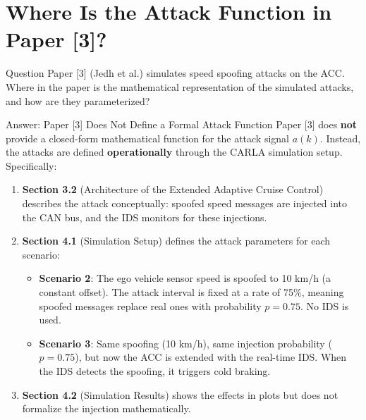 \section{Where Is the Attack Function in Paper [3]?}

\begin{questionbox}{Question}
Paper [3] (Jedh et al.) simulates speed spoofing attacks on the ACC. Where in the paper is the mathematical representation of the simulated attacks, and how are they parameterized?
\end{questionbox}

\begin{contextbox}{Answer: Paper [3] Does Not Define a Formal Attack Function}
Paper [3] does \textbf{not} provide a closed-form mathematical function for the attack signal $a(k)$. Instead, the attacks are defined \textbf{operationally} through the CARLA simulation setup. Specifically:

\begin{enumerate}[label=\textbf{\arabic*.}]
  \item \textbf{Section 3.2} (Architecture of the Extended Adaptive Cruise Control) describes the attack conceptually: spoofed speed messages are injected into the CAN bus, and the IDS monitors for these injections.

  \item \textbf{Section 4.1} (Simulation Setup) defines the attack parameters for each scenario:
  \begin{itemize}
    \item \textbf{Scenario 2}: The ego vehicle sensor speed is spoofed to 10 km/h (a constant offset). The attack interval is fixed at a rate of 75\%, meaning spoofed messages replace real ones with probability $p = 0.75$. No IDS is used.
    \item \textbf{Scenario 3}: Same spoofing (10 km/h), same injection probability ($p = 0.75$), but now the ACC is extended with the real-time IDS. When the IDS detects the spoofing, it triggers cold braking.
  \end{itemize}

  \item \textbf{Section 4.2} (Simulation Results) shows the effects in plots but does not formalize the injection mathematically.
\end{enumerate}
\end{contextbox}

